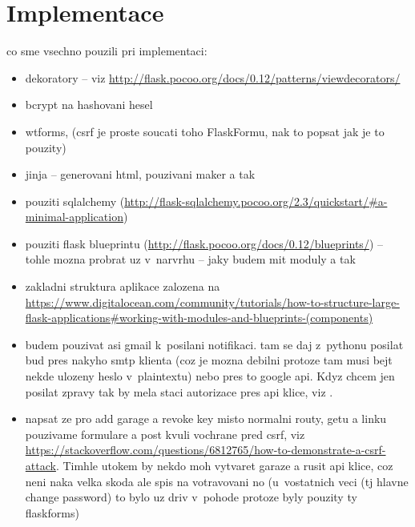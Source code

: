 \chapter{Implementace}
\label{sec:im}

co sme vsechno pouzili pri implementaci:

\begin{itemize}

\item dekoratory -- viz \url{http://flask.pocoo.org/docs/0.12/patterns/viewdecorators/}

\item bcrypt na hashovani hesel

\item wtforms, (csrf je proste soucati toho FlaskFormu, nak to popsat jak je to pouzity)

\item jinja -- generovani html, pouzivani maker a tak

\item pouziti sqlalchemy (\url{http://flask-sqlalchemy.pocoo.org/2.3/quickstart/#a-minimal-application})

\item pouziti flask blueprintu (\url{http://flask.pocoo.org/docs/0.12/blueprints/}) -- tohle mozna probrat uz v~narvrhu -- jaky budem mit moduly a tak

\item zakladni struktura aplikace zalozena na \url{https://www.digitalocean.com/community/tutorials/how-to-structure-large-flask-applications#working-with-modules-and-blueprints-(components)}

\item budem pouzivat asi gmail k~posilani notifikaci. tam se daj z~pythonu posilat bud pres nakyho smtp klienta (coz je mozna debilni protoze tam musi bejt nekde ulozeny heslo v~plaintextu) nebo pres to google api. Kdyz chcem jen posilat zpravy tak by mela staci autorizace pres api klice, viz \cite{email_api}.

\item napsat ze pro add garage a revoke key misto normalni routy, getu a linku pouzivame formulare a post kvuli vochrane pred csrf, viz \url{https://stackoverflow.com/questions/6812765/how-to-demonstrate-a-csrf-attack}. Timhle utokem by nekdo moh vytvaret garaze a rusit api klice, coz neni naka velka skoda ale spis na votravovani no (u~vostatnich veci (tj hlavne change password) to bylo uz driv v~pohode protoze byly pouzity ty flaskforms)


\end{itemize}
